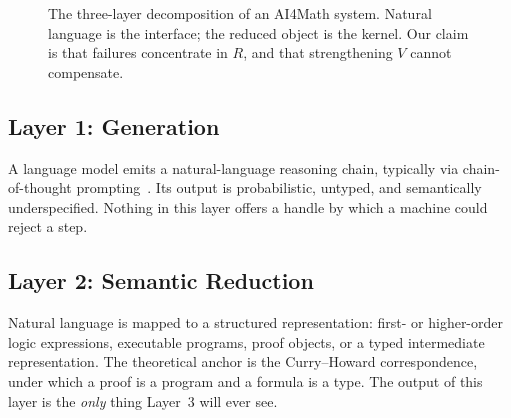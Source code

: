 \documentclass[11pt,a4paper]{article}
\begin{document}
\begin{figure}[t]
\centering
{}
\caption{The three-layer decomposition of an AI4Math system.  Natural language
is the interface; the reduced object is the kernel.  Our claim is that failures
concentrate in $R$, and that strengthening $V$ cannot compensate.}
\label{fig:pipeline}
\end{figure}

\subsection{Layer 1: Generation}
A language model emits a natural-language reasoning chain, typically via
chain-of-thought prompting~\cite{wei2022chain}.  Its output is probabilistic,
untyped, and semantically underspecified.  Nothing in this layer offers a handle
by which a machine could reject a step.

\subsection{Layer 2: Semantic Reduction}
Natural language is mapped to a structured representation: first- or
higher-order logic expressions, executable programs, proof objects, or a typed
intermediate representation.  The theoretical anchor is the
Curry--Howard correspondence, under which a proof is a program and a formula is
a type.  The output of this layer is the \emph{only} thing Layer~3 will ever
see.
\end{document}
